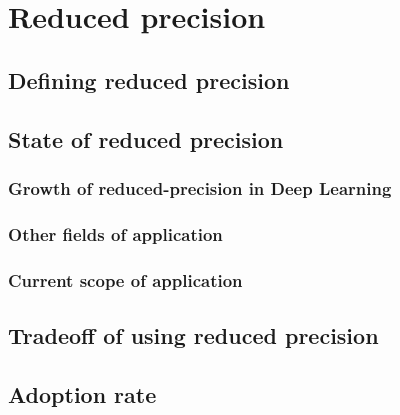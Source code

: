 \chapter{Reduced precision}
\begin{comment}
This section will discuss:
1. What is reduced precision (RP); discuss mixed precision as a sub-category.
2. Advantages of RP (Can make mention on energy consumption)
3. Disavantages of RP.
4. Current field of application (mostly DL).

Alternative outline:
This section will discuss:
1. What is reduced precision (RP); discuss mixed precision as a sub-category.
2. Examples of RP application.
3. Discussion of the prior examples + advanatages/disavantages.
4. Current field of application (mostly DL).

3rd alternative (Same as section 2 but written historically):
historical outline of RP.
How it started, and how it exploded with DL.
RP is great. How relevant to other fields?
\end{comment}

\section{Defining reduced precision}

\section{State of reduced precision}
\subsection{Growth of reduced-precision in Deep Learning}

\subsection{Other fields of application}

\subsection{Current scope of application}


\section{Tradeoff of using reduced precision}

\section{Adoption rate}
